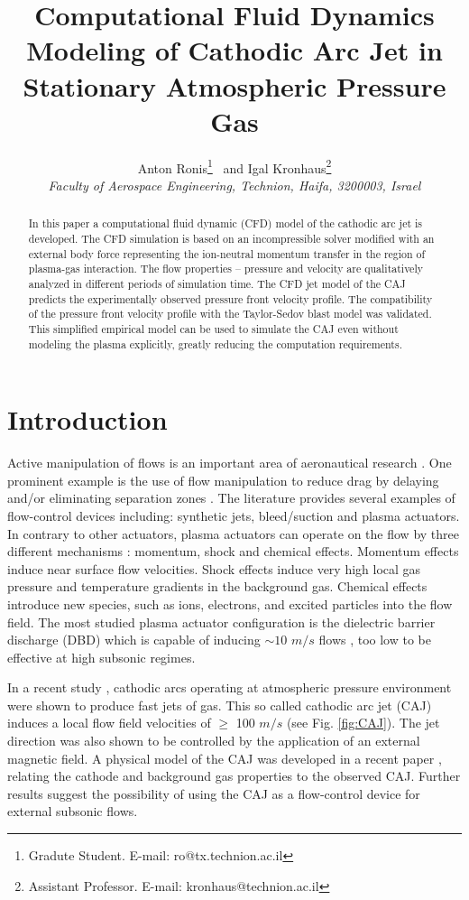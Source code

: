 \documentclass[a4paper]{iacas}%
\title{Computational Fluid Dynamics Modeling of Cathodic Arc Jet in Stationary Atmospheric Pressure Gas}
\author{%
	Anton Ronis\thanks{Gradute Student. E-mail: ro@tx.technion.ac.il}
	\ and
	Igal Kronhaus\thanks{Assistant Professor. E-mail: kronhaus@technion.ac.il}\\
	{\normalsize\itshape
		Faculty of Aerospace Engineering, Technion, Haifa,
		3200003, Israel}
}
\begin{document}
	
	\maketitle
	
	\begin{abstract}
		In this paper a computational fluid dynamic (CFD) model of the cathodic arc jet is developed. The CFD simulation is based on an incompressible solver modified with an external body force representing the ion-neutral momentum transfer in the region of plasma-gas interaction.
		The flow properties -- pressure and velocity are qualitatively analyzed in different periods of simulation time. 
		The CFD jet model of the CAJ predicts the experimentally observed pressure front velocity profile. The compatibility of the pressure front velocity profile with the Taylor-Sedov blast model was validated. This simplified empirical model can be used to simulate the CAJ even without modeling the plasma explicitly, greatly reducing the computation requirements.
		 
	\end{abstract}

\section{Introduction}
Active manipulation of flows is an important area of aeronautical research \cite{GADEL}. One prominent example is the use of flow manipulation to reduce drag by delaying and/or eliminating separation zones \cite{SIMPSON}. The literature provides several examples of flow-control devices including: synthetic jets, bleed/suction and plasma actuators.
In contrary to other actuators, plasma actuators can operate on the flow by three different mechanisms \cite{FLOWCTRL}: momentum, shock and chemical effects. Momentum effects induce near surface flow velocities. Shock effects induce very high local gas pressure and temperature gradients in the background gas. Chemical effects introduce new species, such as ions, electrons, and excited particles into the flow field. The most studied plasma actuator configuration is the dielectric barrier discharge (DBD) which is capable of inducing $\sim10$ $m/s$ flows \cite{FLOWCTRL,KOK,WHALLEY,MOREAU}, too low to be effective at high subsonic regimes.

In a recent study \cite{KR}, cathodic arcs operating at atmospheric pressure environment were shown to produce fast jets of gas. This so called cathodic arc jet (CAJ) induces a local flow field velocities of $\ge$ 100 $m/s$ (see Fig. \ref{fig:CAJ}). The jet direction was also shown to be controlled by the application of an external magnetic field. A physical model of the CAJ was developed in a recent paper \cite{KRClose}, relating the cathode and background gas properties to the observed CAJ. Further results suggest the possibility of using the CAJ as a flow-control device for external subsonic flows\cite{KRFar}.
\end{document}

